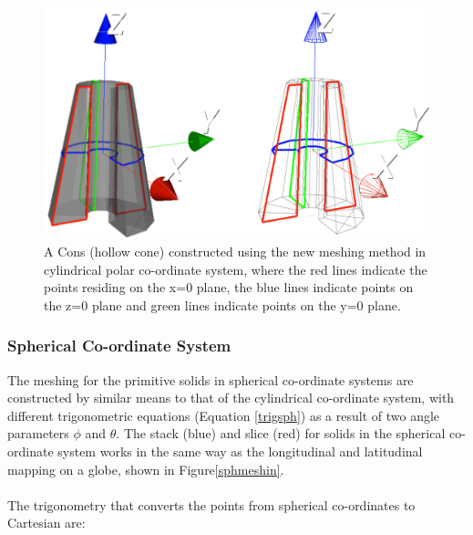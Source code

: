 \documentclass[12pt,a4paper]{article}
\begin{document}
\begin{figure}[h!]
\centering
\includegraphics[scale=0.3]{Images//Coords//consco.png}
\caption[width=\columnwidth]{A Cons (hollow cone) constructed using the new meshing method in cylindrical polar co-ordinate system, where the red lines indicate the points residing on the x=0 plane, the blue lines indicate points on the z=0 plane and green lines indicate points on the y=0 plane.}
\label{consco}
\end{figure}

\newpage
\subsubsection{Spherical Co-ordinate System}\label{sphh}
The meshing for the primitive solids in spherical co-ordinate systems are constructed by similar means to that of the cylindrical co-ordinate system, with different trigonometric equations (Equation \ref{trigsph}) as a result of two angle parameters $\phi$ and $\theta$. The stack (blue) and slice (red) for solids in the spherical co-ordinate system works in the same way as the longitudinal and latitudinal mapping on a globe, shown in Figure\ref{sphmeshin}. 
\\\\
The trigonometry that converts the points from spherical co-ordinates to Cartesian are:
\end{document}
